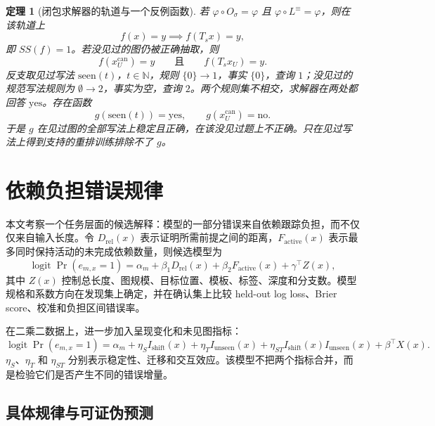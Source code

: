 \documentclass[UTF8,11pt,a4paper]{ctexart}
\theoremstyle{plain}
\newtheorem{theorem}{定理}
\begin{document}
\begin{theorem}[闭包求解器的轨道与一个反例函数]
\label{thm:main-zh}
若 $\varphi\circ O_\sigma=\varphi$ 且 $\varphi\circ L^{\equiv}=\varphi$，则在该轨道上
\begin{equation}
f(x)=y\implies f(T_sx)=y,
\end{equation}
即 $SS(f)=1$。若没见过的图仍被正确抽取，则
\begin{equation}
f(x_U^{\mathrm{can}})=y
\qquad\text{且}\qquad
f(T_sx_U)=y.
\end{equation}
反支取见过写法 $\mathrm{seen}(t)$，$t\in\mathbb{N}$，规则 $\{0\}\to 1$，事实 $\{0\}$，查询 $1$；没见过的规范写法规则为 $\emptyset\to 2$，事实为空，查询 $2$。两个规则集不相交，求解器在两处都回答 $\mathrm{yes}$。存在函数
\begin{equation}
g(\mathrm{seen}(t))=\mathrm{yes},
\qquad
g(x_U^{\mathrm{can}})=\mathrm{no}.
\end{equation}
于是 $g$ 在见过图的全部写法上稳定且正确，在该没见过题上不正确。只在见过写法上得到支持的重排训练排除不了 $g$。
\end{theorem}

\section{依赖负担错误规律}

本文考察一个任务层面的候选解释：模型的一部分错误来自依赖跟踪负担，而不仅仅来自输入长度。令 $D_{\mathrm{rel}}(x)$ 表示证明所需前提之间的距离，$F_{\mathrm{active}}(x)$ 表示最多同时保持活动的未完成依赖数量，则候选模型为
\begin{equation}
\operatorname{logit}\Pr(e_{m,x}=1)
=\alpha_m+\beta_1D_{\mathrm{rel}}(x)
+\beta_2F_{\mathrm{active}}(x)+\gamma^\top Z(x),
\end{equation}
其中 $Z(x)$ 控制总长度、图规模、目标位置、模板、标签、深度和分支数。模型规格和系数方向在发现集上确定，并在确认集上比较 held-out log loss、Brier score、校准和负担区间错误率。

在二乘二数据上，进一步加入呈现变化和未见图指标：
\begin{equation}
\operatorname{logit}\Pr(e_{m,x}=1)
=\alpha_m+\eta_S I_{\mathrm{shift}}(x)
+\eta_T I_{\mathrm{unseen}}(x)
+\eta_{ST}I_{\mathrm{shift}}(x)I_{\mathrm{unseen}}(x)
+\beta^\top X(x).
\end{equation}
$\eta_S$、$\eta_T$ 和 $\eta_{ST}$ 分别表示稳定性、迁移和交互效应。该模型不把两个指标合并，而是检验它们是否产生不同的错误增量。

\subsection{具体规律与可证伪预测}
\end{document}
